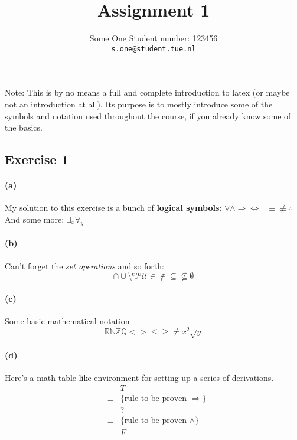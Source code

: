 \documentclass[a4paper,twoside,11pt]{article}
\newcommand{\R}{{\mathbb R}}
\newcommand{\N}{{\mathbb N}}
\newcommand{\Z}{{\mathbb Z}}
\newcommand{\Q}{{\mathbb Q}}
\begin{document}
\title{\vspace{-2\baselineskip} 
Assignment 1
}
\author{Some One \qquad Student number: 123456 \\{\tt s.one@student.tue.nl}}


\maketitle


Note: This is by no means a full and complete introduction to latex (or maybe not an introduction at all). Its purpose is to mostly introduce some of the symbols and notation used throughout the course, if you already know some of the basics.

\subsection*{Exercise 1}

\paragraph{(a)} 
My solution to this exercise is a bunch of \textbf{logical symbols}:
$\vee \wedge \Rightarrow \Leftrightarrow \neg \equiv \not\equiv \therefore$\\
And some more: $\exists_x \forall_y$

\paragraph{(b)}
Can't forget the \emph{set operations} and so forth:
\[ \cap \cup \setminus {}^\text{c} \mathcal{P} \mathcal{U} \in \not\in \subseteq \not\subseteq \emptyset \]

\paragraph{(c)}
Some basic mathematical notation
\[ \R \N \Z \Q < > \leq \geq \neq x^2 \sqrt{y} \]

\paragraph{(d)}

Here's a math table-like environment for setting up a series of derivations.
\begin{eqnarray*}
  && T \\
  &\equiv& \{ \text{rule to be proven } \Rightarrow \} \\
  && ? \\
  &\equiv& \{ \text{rule to be proven } \wedge \} \\
  && F 
\end{eqnarray*}
\end{document}
